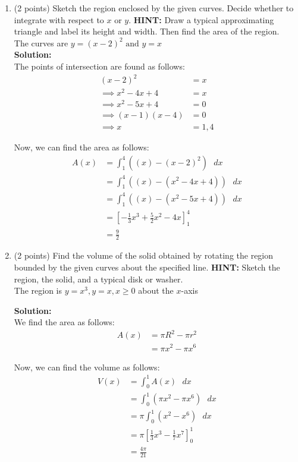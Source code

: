 \documentclass[paper=a4, fontsize=11pt]{scrartcl} %
\numberwithin{equation}{section} %
\numberwithin{figure}{section} %
\numberwithin{table}{section} %
\begin{document}
\begin{enumerate}
\setlength{\itemsep}{0.45in}
\item (2 points) Sketch the region enclosed by the given curves.  Decide whether to integrate with respect to $x$ or $y$.  \textbf{HINT:} Draw a typical approximating triangle and label its height and width.  Then find the area of the region.\\

The curves are $\displaystyle y=(x-2)^2 \text{ and } y=x$\\

\noindent\textbf{Solution:}\\
The points of intersection are found as follows:
\begin{align*}
(x-2)^2 &= x \\
\implies x^2 -4x + 4 &= x\\
\implies x^2 - 5x + 4 &= 0\\
\implies (x-1)(x-4) &= 0\\
\implies x &= 1,4
\end{align*}

Now, we can find the area as follows:
\begin{align*}
A(x) &= \int_1^4 \left( (x) - (x-2)^2 \right) \text{  } dx \\
&= \int_1^4 \left( (x) - (x^2-4x+4) \right) \text{  } dx \\
&= \int_1^4 \left( (x) - (x^2 - 5x + 4) \right) \text{  } dx \\
&= \left[ -\frac{1}{3}x^3 + \frac{5}{2}x^2 - 4x\right]_1^4\\
&= \boxed{\frac{9}{2}}
\end{align*}

\item (2 points) Find the volume of the solid obtained by rotating the region bounded by the given curves about the specified line.  \textbf{HINT:} Sketch the region, the solid, and a typical disk or washer.\\

The region is $\displaystyle y=x^3, y=x, x \ge 0$ about the $x$-axis

\noindent\textbf{Solution:}\\
We find the area as follows:
\begin{align*}
A(x) &= \pi R^2 - \pi r^2\\
&= \pi x^2 - \pi x^6
\end{align*}

Now, we can find the volume as follows:
\begin{align*}
V(x) &= \int_0^1 A(x) \text{  } dx \\
&= \int_0^1 \left( \pi x^2 - \pi x^6 \right) \text{  } dx \\
&=  \pi  \int_0^1  \left(x^2 - x^6 \right) \text{  } dx \\
&=   \pi \left[ \frac{1}{3}x^3 - \frac{1}{7}x^7 \right]_0^1\\
&= \boxed{ \frac{4 \pi}{21} }
\end{align*}


\end{enumerate}
\end{document}
